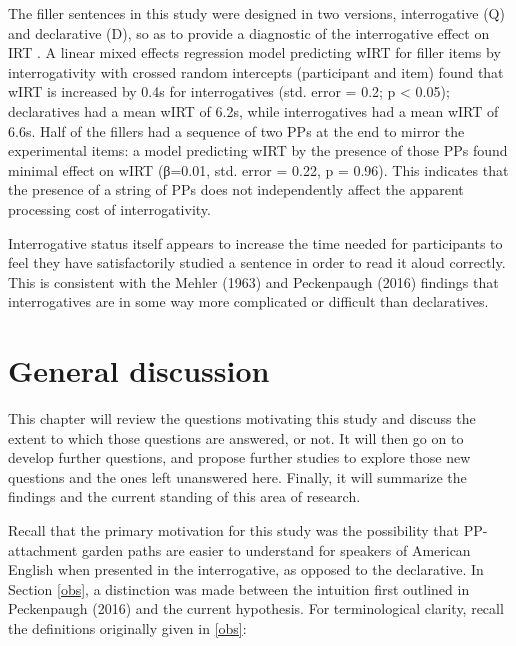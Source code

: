 \documentclass[12pt,oneside]{book}
\begin{document}
The filler sentences in this study were designed in two versions, interrogative (Q) and declarative (D), so as to provide a diagnostic of the interrogative effect on IRT . A linear mixed effects regression model predicting wIRT for filler items by interrogativity with crossed random intercepts (participant and item) found that wIRT is increased by 0.4s for interrogatives (std. error = 0.2; p \textless{} 0.05); declaratives had a mean wIRT of 6.2s, while interrogatives had a mean wIRT of 6.6s. Half of the fillers had a sequence of two PPs at the end  to mirror the experimental items: a model predicting wIRT by the presence of those PPs found minimal effect on wIRT (β=0.01, std. error = 0.22, p = 0.96). This indicates that the presence of a string of PPs does not independently affect the apparent processing cost of interrogativity.

Interrogative status itself appears to increase the time needed for participants to feel they have satisfactorily studied a sentence in order to read it aloud correctly. This is consistent with the Mehler (1963) and Peckenpaugh (2016) findings that interrogatives are in some way more complicated or difficult than declaratives.

\clearpage

\hypertarget{general-discussion}{%
\chapter{General discussion}\label{general-discussion}}

This chapter will review the questions motivating this study and discuss the extent to which those questions are answered, or not. It will then go on to develop further questions, and propose further studies to explore those new questions and the ones left unanswered here. Finally, it will summarize the findings and the current standing of this area of research.

Recall that the primary motivation for this study was the possibility that PP-attachment garden paths are easier to understand for speakers of American English when presented in the interrogative, as opposed to the declarative. In Section \ref{obs}, a distinction was made between the intuition first outlined in Peckenpaugh (2016) and the current hypothesis. For terminological clarity, recall the definitions originally given in \ref{obs}:
\end{document}
